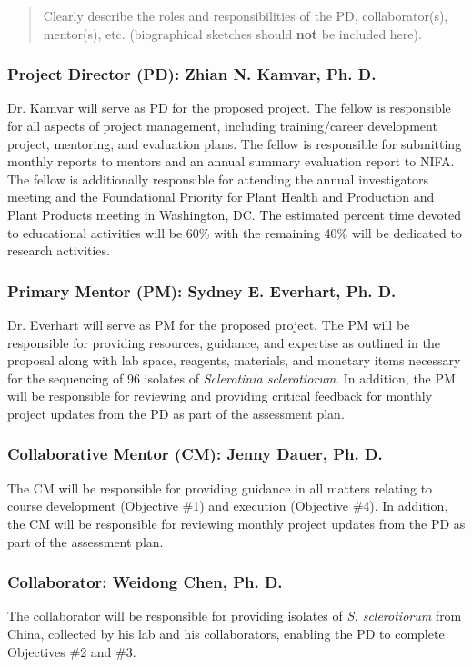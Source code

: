 \documentclass[12pt,letterpaper]{article}
\title{\ruleline{Key Personnel}}
\begin{document}
\maketitle

\begin{quote}
Clearly describe the roles and responsibilities of the PD, collaborator(s), mentor(s), etc.
(biographical sketches should \textbf{not} be included here).
\end{quote}

\subsubsection{Project Director (PD): Zhian N. Kamvar, Ph. D.}

\noindent Dr. Kamvar will serve as PD for the proposed project. 
The fellow is responsible for all aspects of project management, including training/career development project, mentoring, and evaluation plans. 
The fellow is responsible for submitting monthly reports to mentors and an annual summary evaluation report to NIFA.
The fellow is additionally responsible for attending the annual investigators meeting and the Foundational Priority for Plant Health and Production and Plant Products meeting in Washington, DC.
The estimated percent time devoted to educational activities will be 60\% with the remaining 40\% will be dedicated to research activities. 

\subsubsection{Primary Mentor (PM): Sydney E. Everhart, Ph. D.}

\noindent Dr. Everhart will serve as PM for the proposed project. 
The PM will be responsible for providing resources, guidance, and expertise as outlined in the proposal along with lab space, reagents, materials, and monetary items necessary for the sequencing of 96 isolates of \textit{Sclerotinia sclerotiorum}. 
In addition, the PM will be responsible for reviewing and providing critical feedback for monthly project updates from the PD as part of the assessment plan. 

\subsubsection{Collaborative Mentor (CM): Jenny Dauer, Ph. D.}
The CM will be responsible for providing guidance in all matters relating to course development (Objective \#1) and execution (Objective \#4). 
In addition, the CM will be responsible for reviewing monthly project updates from the PD as part of the assessment plan.

\subsubsection{Collaborator: Weidong Chen, Ph. D.}
The collaborator will be responsible for providing isolates of \textit{S. sclerotiorum} from China, collected by his lab and his collaborators, enabling the PD to complete Objectives \#2 and \#3.
\end{document}
